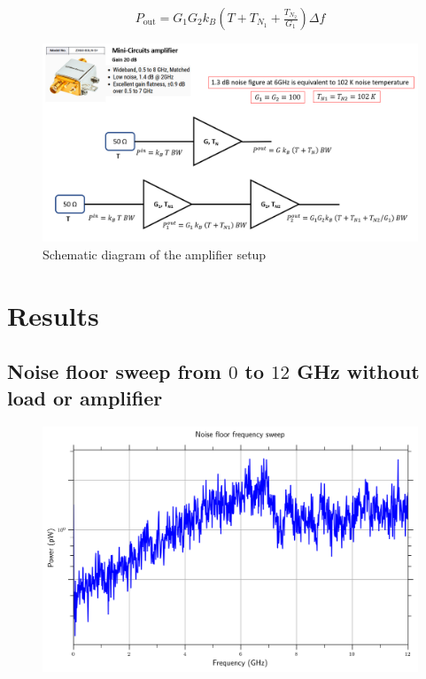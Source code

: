 \documentclass[english,12pt,a4paper]{article}
\begin{document}
 \begin{equation}
 	P_{\textrm{out}} = G_1G_2k_B\left(T+T_{N_1}+\tfrac{T_{N_2}}{G_1} \right)\Delta f
 \end{equation}
 
\begin{figure}[H]
	\includegraphics[width=1\linewidth]{"noise of minicircuits amplifier chain"}
	\caption{Schematic diagram of the amplifier setup}
	\label{fig:noise-of-minicircuits-amplifier-chain}
\end{figure}

\section{Results}
\hypertarget{noise-floor-sweep-from-0-to-12-ghz-without-load-or-amplifier}{%
	\subsection{\texorpdfstring{Noise floor sweep from \(0\) to \(12\) GHz
			without load or
			amplifier}{Noise floor sweep from 0 to 12 GHz without load or amplifier}}\label{noise-floor-sweep-from-0-to-12-ghz-without-load-or-amplifier}}

\begin{figure}[H]
	\includegraphics[width=1\linewidth]{Plots/noise_floor_sweep}
	\caption[Noise floor frequency sweep]{}
	\label{fig:noisefloorsweep}
\end{figure}
\end{document}
